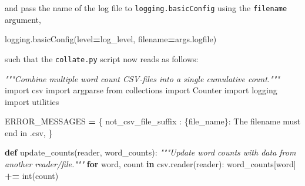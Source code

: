 \documentclass[
]{krantz}
\makeatletter
\newenvironment{Shaded}{\begin{snugshade}}{\end{snugshade}}
\newcommand{\BuiltInTok}[1]{#1}
\newcommand{\CommentTok}[1]{\textcolor[rgb]{0.56,0.35,0.01}{\textit{#1}}}
\newcommand{\ControlFlowTok}[1]{\textcolor[rgb]{0.13,0.29,0.53}{\textbf{#1}}}
\newcommand{\ImportTok}[1]{#1}
\newcommand{\KeywordTok}[1]{\textcolor[rgb]{0.13,0.29,0.53}{\textbf{#1}}}
\newcommand{\NormalTok}[1]{#1}
\newcommand{\OperatorTok}[1]{\textcolor[rgb]{0.81,0.36,0.00}{\textbf{#1}}}
\newcommand{\SpecialCharTok}[1]{\textcolor[rgb]{0.00,0.00,0.00}{#1}}
\newcommand{\StringTok}[1]{\textcolor[rgb]{0.31,0.60,0.02}{#1}}
\newenvironment{kframe}{%
\medskip{}
\setlength{\fboxsep}{.8em}
 \def\at@end@of@kframe{}%
 \ifinner\ifhmode%
  \def\at@end@of@kframe{\end{minipage}}%
  \begin{minipage}{\columnwidth}%
 \fi\fi%
 \def\FrameCommand##1{\hskip\@totalleftmargin \hskip-\fboxsep
 \colorbox{shadecolor}{##1}\hskip-\fboxsep
     \hskip-\linewidth \hskip-\@totalleftmargin \hskip\columnwidth}%
 \MakeFramed {\advance\hsize-\width
   \@totalleftmargin\z@ \linewidth\hsize
   \@setminipage}}%
 {\par\unskip\endMakeFramed%
 \at@end@of@kframe}
\renewenvironment{Shaded}{\begin{kframe}}{\end{kframe}}
\makeatother
\begin{document}
and pass the name of the log file to \texttt{logging.basicConfig}
using the \texttt{filename} argument,

\begin{Shaded}
\begin{Highlighting}[]
\NormalTok{logging.basicConfig(level}\OperatorTok{=}\NormalTok{log\_level, filename}\OperatorTok{=}\NormalTok{args.logfile)}
\end{Highlighting}
\end{Shaded}

such that the \texttt{collate.py} script now reads as follows:

\begin{Shaded}
\begin{Highlighting}[]
\CommentTok{"""Combine multiple word count CSV{-}files into a single cumulative count."""}
\ImportTok{import}\NormalTok{ csv}
\ImportTok{import}\NormalTok{ argparse}
\ImportTok{from}\NormalTok{ collections }\ImportTok{import}\NormalTok{ Counter}
\ImportTok{import}\NormalTok{ logging}
\ImportTok{import}\NormalTok{ utilities}


\NormalTok{ERROR\_MESSAGES }\OperatorTok{=}\NormalTok{ \{}
    \StringTok{\textquotesingle{}not\_csv\_file\_suffix\textquotesingle{}}\NormalTok{ : }\StringTok{\textquotesingle{}}\SpecialCharTok{\{file\_name\}}\StringTok{: The filename must end in \textasciigrave{}.csv\textasciigrave{}\textquotesingle{}}\NormalTok{,}
\NormalTok{\}}

\KeywordTok{def}\NormalTok{ update\_counts(reader, word\_counts):}
    \CommentTok{"""Update word counts with data from another reader/file."""}
    \ControlFlowTok{for}\NormalTok{ word, count }\KeywordTok{in}\NormalTok{ csv.reader(reader):}
\NormalTok{        word\_counts[word] }\OperatorTok{+=} \BuiltInTok{int}\NormalTok{(count)}


\end{Highlighting}
\end{Shaded}
\end{document}
